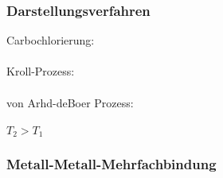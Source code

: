 \documentclass[a4paper]{article}
\begin{document}
\subsubsection*{Darstellungsverfahren}
Carbochlorierung:\\
\\
Kroll-Prozess:\\
\\
von Arhd-deBoer Prozess:\\
\\
$T_2 > T_1$

\subsubsection*{Metall-Metall-Mehrfachbindung}
\end{document}
